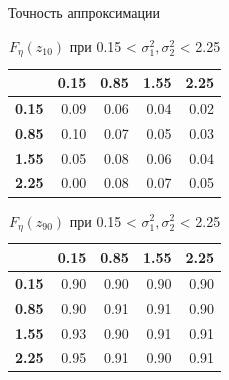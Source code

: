 \documentclass[ucs, notheorems, handout]{beamer}
\begin{document}
\begin{frame}{Точность аппроксимации }
	
	\begin{table}[!hhh]
		\centering
		\caption{$F_{\eta}(z_{10})$ при 0.15 < $\sigma_{1}^{2}, \sigma_{2}^{2}$ < 2.25 }
		\label{tab5}
		\begin{tabular}{rrrrr}
			\hline
			& \textbf{0.15} & \textbf{0.85} & \textbf{1.55} & \textbf{2.25} \\
			\hline
			\textbf{0.15} & 0.09 & 0.06 & 0.04 & 0.02 \\ 
			\textbf{0.85} & 0.10 & 0.07 & 0.05 & 0.03 \\ 
			\textbf{1.55} & 0.05 & 0.08 & 0.06 & 0.04 \\ 
			\textbf{2.25} & 0.00 & 0.08 & 0.07 & 0.05 \\ 
			\hline
		\end{tabular}
	\end{table}
	
	\begin{table}[!hhh]
		\centering
		\caption{$F_{\eta}(z_{90})$ при 0.15 < $\sigma_{1}^{2}, \sigma_{2}^{2}$ < 2.25 }
		\label{tab6}
		\begin{tabular}{rrrrr}
			\hline
			& \textbf{0.15} & \textbf{0.85} & \textbf{1.55} & \textbf{2.25} \\
			\hline
			\textbf{0.15} & 0.90 & 0.90 & 0.90 & 0.90 \\ 
			\textbf{0.85} & 0.90 & 0.91 & 0.91 & 0.90 \\ 
			\textbf{1.55} & 0.93 & 0.90 & 0.91 & 0.91 \\ 
			\textbf{2.25} & 0.95 & 0.91 & 0.90 & 0.91 \\ 
			\hline
		\end{tabular}
	\end{table}
\end{frame}
\end{document}
